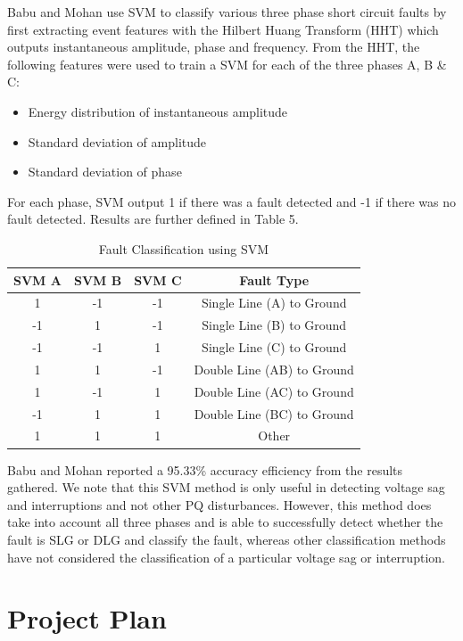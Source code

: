 \documentclass[12pt]{article}
\begin{document}
{Babu and Mohan \cite{SVM} use SVM to classify various three phase short circuit faults by first extracting event features with the Hilbert Huang Transform (HHT) which outputs instantaneous amplitude, phase and frequency. From the HHT, the following features were used to train a SVM for each of the three phases A, B \& C:
\begin{itemize}
\item Energy distribution of instantaneous amplitude 
\item Standard deviation of amplitude
\item Standard deviation of phase 
\end{itemize}
For each phase, SVM output 1 if there was a fault detected and -1 if there was no fault detected. Results are further defined in Table 5.
\begin{table}[H]
\centering
\begin{tabular}{|c|c|c|c|}
\hline
SVM A & SVM B & SVM C & Fault Type\\
\hline
\hline
\cellcolor{red!25}1 & -1 & -1 & Single Line (A) to Ground\\
\hline
-1 & \cellcolor{red!25}1 & -1 & Single Line (B) to Ground \\
\hline
-1 & -1 & \cellcolor{red!25}1 & Single Line (C) to Ground\\
\hline
\cellcolor{red!25}1 & \cellcolor{red!25}1 & -1 & Double Line (AB) to Ground\\
\hline
\cellcolor{red!25}1 & -1 & \cellcolor{red!25}1 & Double Line (AC) to Ground\\
\hline
-1 & \cellcolor{red!25}1 & \cellcolor{red!25}1 & Double Line (BC) to Ground  \\
\hline 
\cellcolor{red!25}1 & \cellcolor{red!25}1 &\cellcolor{red!25} 1 & Other\\
\hline
\end{tabular}
\caption{Fault Classification using SVM }
\end{table}

Babu and Mohan reported a 95.33\% accuracy efficiency from the results gathered. We note that this SVM method is only useful in detecting voltage sag and interruptions and not other PQ disturbances. However, this method does take into account all three phases and is able to successfully detect whether the fault is SLG or DLG and classify the fault, whereas other classification methods have not considered the classification of a particular voltage sag or interruption.


\newpage 
\section{Project Plan}
}
\end{document}
